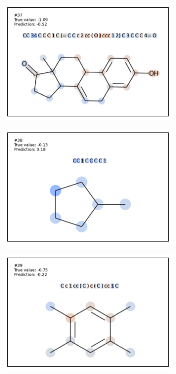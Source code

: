 \begin{figure}
\begin{subfigure}[b]{0.33\textwidth}
\end{subfigure}\begin{subfigure}[b]{0.33\textwidth} 
  \centering 
  \includegraphics[width=\textwidth]{figures/esol/esol37.pdf} 
\end{subfigure}
\begin{subfigure}[b]{0.33\textwidth} 
  \centering 
  \includegraphics[width=\textwidth]{figures/esol/esol38.pdf} 
\end{subfigure}\begin{subfigure}[b]{0.33\textwidth} 
  \centering 
  \includegraphics[width=\textwidth]{figures/esol/esol39.pdf} 

\end{subfigure}
\end{figure}
